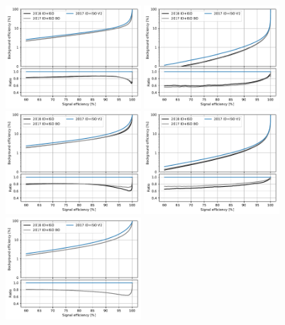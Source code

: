 \begin{figure}[!htb]
\vspace*{0.3cm}
\begin{center}
\includegraphics[width=0.45\textwidth]{Figures/Electrons/2018_EB1_5.pdf}
\includegraphics[width=0.45\textwidth]{Figures/Electrons/2018_EB1_10.pdf} \\
\includegraphics[width=0.45\textwidth]{Figures/Electrons/2018_EB2_5.pdf}
\includegraphics[width=0.45\textwidth]{Figures/Electrons/2018_EB2_10.pdf} \\
\includegraphics[width=0.45\textwidth]{Figures/Electrons/2018_EE_5.pdf}

\end{center}
\end{figure}
